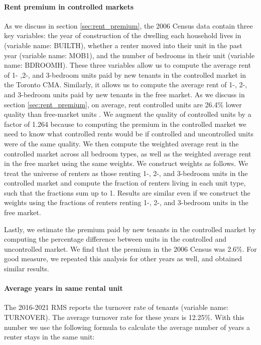 \documentclass[parskip=full]{article}
\begin{document}
\paragraph{Rent premium in controlled markets}

As we discuss in section \ref{sec:rent_premium}, the 2006 Census data contain three key variables: the year of construction of the dwelling each household lives in (variable name: BUILTH), whether a renter moved into their unit in the past year (variable name: MOB1), and the number of bedrooms in their unit (variable name: BDROOMH). These three variables allow us to compute the average rent of 1- ,2-, and 3-bedroom units paid by new tenants in the controlled market in the Toronto CMA. Similarly, it allows us to compute the average rent of 1-, 2-, and 3-bedroom units paid by new tenants in the free market. As we discuss in section \ref{sec:rent_premium}, on average, rent controlled units are 26.4\% lower quality than free-market units \citep{zhang-gou}. We augment the quality of controlled units by a factor of 1.264 because to computing the premium in the controlled market we need to know what controlled rents would be if controlled and uncontrolled units were of the same quality. We then compute the weighted average rent in the controlled market across all bedroom types, as well as the weighted average rent in the free market using the same weights. We construct weights as follows. We treat the universe of renters as those renting 1-, 2-, and 3-bedroom units in the controlled market and compute the fraction of renters living in each unit type, such that the fractions sum up to 1. Results are similar even if we construct the weights using the fractions of renters renting 1-, 2-, and 3-bedroom units in the free market.

Lastly, we estimate the premium paid by new tenants in the controlled market by computing the percentage difference between units in the controlled and uncontrolled market. We find that the premium in the 2006 Census was 2.6\%. For good measure, we repeated this analysis for other years as well, and obtained similar results.

\paragraph{Average years in same rental unit}

The 2016-2021 RMS reports the turnover rate of tenants (variable name: TURNOVER). The average turnover rate for these years is 12.25\%. With this number we use the following formula to calculate the average number of years a renter stays in the same unit:
\end{document}
